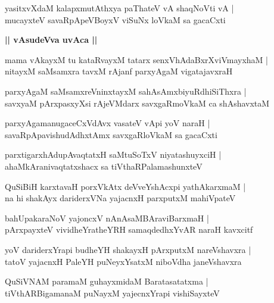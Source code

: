 \documentclass[twoside,12pt,openright]{book}
\newcounter{shloka}[chapter]
\def\uvaca#1{\centerline{{\large\textbf{#1}}}}
\begin{document}
\begin{shloka}
yasitxvXdaM kalapxmutAthxya paThateV vA shaqNoVti vA |\\
mucayxteV savaRpApeVBoyxV viSuNx loVkaM sa gacaCxti 
\end{shloka}

\uvaca{ || vAsudeVva uvAca ||}

\begin{shloka}
mama vAkayxM tu kataRvayxM tatarx senxVhAdaBxrXviVmayxhaM |\\
nitayxM saMsamxra tavxM rAjanf parxyAgaM vigatajavxraH 
\end{shloka}

\begin{shloka}
parxyAgaM saMsamxreVninxtayxM sahAsAmxbiyuRdhiSiThxra |\\
savxyaM pArxpasxyXsi rAjeVMdarx savxgaRmoVkaM ca shAshavxtaM 
\end{shloka}

\begin{shloka}
parxyAgamanugaceCxVdAvx vasateV vApi yoV naraH |\\
savaRpApavishudAdhxtAmx savxgaRloVkaM sa gacaCxti
\end{shloka}

\begin{shloka}
parxtigarxhAdupAvaqtatxH saMtuSoTxV niyatashuyxciH |\\
ahaMkAranivaqtatxshacx sa tiVthaRPalamashunxteV
\end{shloka}

\begin{shloka}
QuSiBiH karxtavaH porxVkAtx deVveYshAcxpi yathAkarxmaM |\\
na hi shakAyx dariderxVNa yajacnxH parxputxM mahiVpateV 
\end{shloka}

\begin{shloka}
bahUpakaraNoV yajoncxV nAnAsaMBAraviBarxmaH |\\
pArxpayxteV vividheYratheYRH samaqdedhxYvAR naraH kavxcitf 
\end{shloka}

\begin{shloka}
yoV dariderxYrapi budheYH shakayxH pArxputxM nareVshavxra |\\
tatoV yajacnxH PaleYH puNeyxYsatxM niboVdha janeVshavxra
\end{shloka}

\begin{shloka}
QuSiVNAM  paramaM guhayxmidaM Baratasatatxma |\\
tiVthARBigamanaM puNayxM yajecnxYrapi vishiSayxteV 
\end{shloka}
\end{document}
